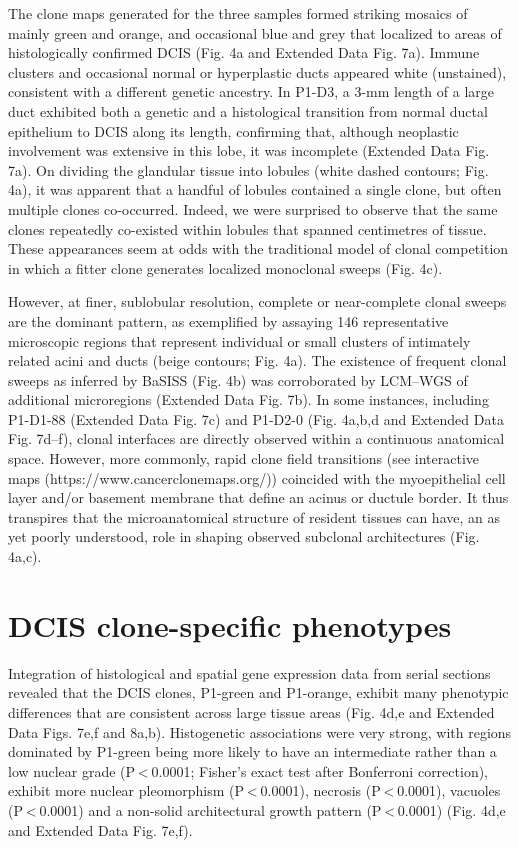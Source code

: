 The clone maps generated for the three samples formed striking mosaics of mainly green and orange, and occasional blue and grey that localized to areas of histologically confirmed DCIS (Fig. 4a and Extended Data Fig. 7a). Immune clusters and occasional normal or hyperplastic ducts appeared white (unstained), consistent with a different genetic ancestry. In P1-D3, a 3-mm length of a large duct exhibited both a genetic and a histological transition from normal ductal epithelium to DCIS along its length, confirming that, although neoplastic involvement was extensive in this lobe, it was incomplete (Extended Data Fig. 7a). On dividing the glandular tissue into lobules (white dashed contours; Fig. 4a), it was apparent that a handful of lobules contained a single clone, but often multiple clones co-occurred. Indeed, we were surprised to observe that the same clones repeatedly co-existed within lobules that spanned centimetres of tissue. These appearances seem at odds with the traditional model of clonal competition in which a fitter clone generates localized monoclonal sweeps (Fig. 4c).

However, at finer, sublobular resolution, complete or near-complete clonal sweeps are the dominant pattern, as exemplified by assaying 146 representative microscopic regions that represent individual or small clusters of intimately related acini and ducts (beige contours; Fig. 4a). The existence of frequent clonal sweeps as inferred by BaSISS (Fig. 4b) was corroborated by LCM–WGS of additional microregions (Extended Data Fig. 7b). In some instances, including P1-D1-88 (Extended Data Fig. 7c) and P1-D2-0 (Fig. 4a,b,d and Extended Data Fig. 7d–f), clonal interfaces are directly observed within a continuous anatomical space. However, more commonly, rapid clone field transitions (see interactive maps (https://www.cancerclonemaps.org/)) coincided with the myoepithelial cell layer and/or basement membrane that define an acinus or ductule border. It thus transpires that the microanatomical structure of resident tissues can have, an as yet poorly understood, role in shaping observed subclonal architectures (Fig. 4a,c).

\section{DCIS clone-specific phenotypes}

Integration of histological and spatial gene expression data from serial sections revealed that the DCIS clones, P1-green and P1-orange, exhibit many phenotypic differences that are consistent across large tissue areas (Fig. 4d,e and Extended Data Figs. 7e,f and 8a,b). Histogenetic associations were very strong, with regions dominated by P1-green being more likely to have an intermediate rather than a low nuclear grade (P < 0.0001; Fisher’s exact test after Bonferroni correction), exhibit more nuclear pleomorphism (P < 0.0001), necrosis (P < 0.0001), vacuoles (P < 0.0001) and a non-solid architectural growth pattern (P < 0.0001) (Fig. 4d,e and Extended Data Fig. 7e,f).

